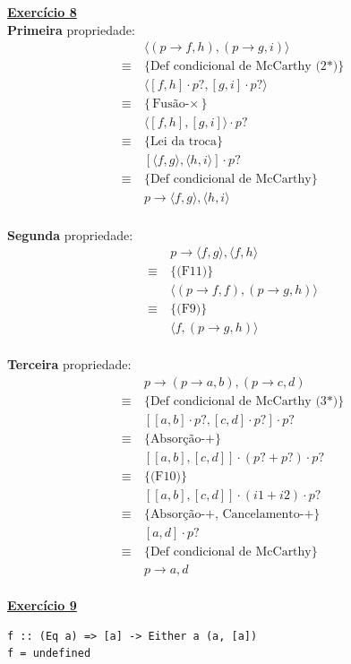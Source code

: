 \documentclass[a4paper,11pt]{article}
\begin{document}
	\newpage
	
	\noindent \underline{\textbf{Exercício 8}}\\
	
	\noindent \textbf{Primeira} propriedade:
	\[
	\begin{aligned}
		& \langle (p \rightarrow f, h), (p \rightarrow g, i) \rangle \\
		\equiv \  &\{\text{Def condicional de McCarthy (2*)}\}\\
		& \langle [f, h] \cdot p?, [g, i] \cdot p? \rangle \\
		\equiv \  &\{\text{Fusão-$\times$}\}\\
		& \langle [f, h] , [g, i] \rangle \cdot p? \\
		\equiv \  &\{\text{Lei da troca}\}\\
		& [\langle f, g \rangle, \langle h, i \rangle] \cdot p? \\
		\equiv \  &\{\text{Def condicional de McCarthy}\}\\
		& p \rightarrow \langle f, g \rangle, \langle h, i \rangle \\
	\end{aligned}
	\]
	
	\noindent \textbf{Segunda} propriedade:
	\[
	\begin{aligned}
		&p \rightarrow \langle f, g \rangle, \langle f, h \rangle \\
		\equiv \  &\{\text{(F11)}\}\\
		& \langle (p \rightarrow f, f), (p \rightarrow g, h) \rangle \\
		\equiv \  &\{\text{(F9)}\}\\
		& \langle f, (p \rightarrow g, h) \rangle \\
	\end{aligned}
	\]
	
	\noindent \textbf{Terceira} propriedade:
	\[
	\begin{aligned}
		&p \rightarrow (p \rightarrow a, b) , (p \rightarrow c, d) \\
		\equiv \  &\{\text{Def condicional de McCarthy (3*)}\}\\
		& [[a, b] \cdot p?, [c, d] \cdot p?] \cdot p? \\
		\equiv \  &\{\text{Absorção-+}\}\\
		& [[a, b], [c, d]] \cdot (p? + p?) \cdot p? \\
		\equiv \  &\{\text{(F10)}\}\\
		& [[a, b], [c, d]] \cdot (i1 + i2) \cdot p? \\
		\equiv \  &\{\text{Absorção-+, Cancelamento-+}\}\\
		& [a, d] \cdot p? \\
		\equiv \  &\{\text{Def condicional de McCarthy}\}\\
		& p \rightarrow a, d \\
	\end{aligned}
	\]
	
	\noindent \underline{\textbf{Exercício 9}}
	
\begin{verbatim}
f :: (Eq a) => [a] -> Either a (a, [a])
f = undefined
\end{verbatim}
	
	
\end{document}
